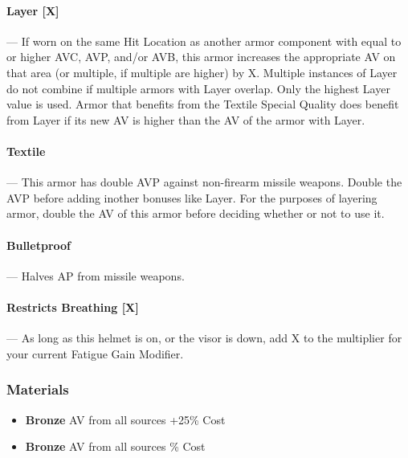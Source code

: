 \documentclass[oneside,11pt,english]{book}
\begin{document}
\vspace*{-10pt}\paragraph[Layer]{\label{par:Layer}Layer [X]}---\quad
If worn on the same Hit Location as another armor component with equal to or
higher AVC, AVP, and/or AVB, this armor increases the appropriate AV on that
area (or multiple, if multiple are higher) by X. Multiple instances of Layer do
not combine if multiple armors with Layer overlap. Only the highest Layer value
is used. Armor that benefits from the Textile Special Quality does benefit from
Layer if its new AV is higher than the AV of the armor with Layer. 
\vspace*{-10pt}\paragraph{\label{par:Textile}Textile}---\quad
This armor has double AVP against non-firearm missile weapons. Double the AVP
before adding inother bonuses like Layer. For the purposes of layering armor,
double the AV of this armor before deciding whether or not to use it. 
\vspace*{-10pt}\paragraph{\label{par:Bulletproof}Bulletproof}---\quad
Halves AP from missile weapons.
\vspace*{-10pt}\paragraph[Restricts Breathing]{\label{par:Restricts Breathing}Restricts Breathing [X]}---\quad
As long as this helmet is on, or the visor is down, add X to the multiplier for
your current Fatigue Gain Modifier. 

\subsubsection{Materials}
\begin{itemize}
\item [] \textbf{Bronze}
   AV from all sources
  \subitem +25\% Cost
\end{itemize}

\begin{itemize}
\item [] \textbf{Bronze}
   AV from all sources
  \% Cost
\end{itemize}
\end{document}
